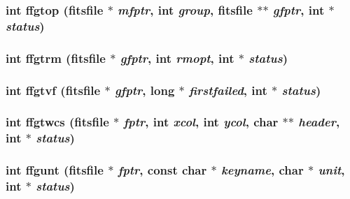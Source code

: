 \subsubsection{\setlength{\rightskip}{0pt plus 5cm}int ffgtop (\bf{fitsfile} $\ast$ {\em mfptr}, int {\em group}, \bf{fitsfile} $\ast$$\ast$ {\em gfptr}, int $\ast$ {\em status})}\label{src_2fitsio_8h_57ba25ba0c05bbdf61f15e21900264ec}


\subsubsection{\setlength{\rightskip}{0pt plus 5cm}int ffgtrm (\bf{fitsfile} $\ast$ {\em gfptr}, int {\em rmopt}, int $\ast$ {\em status})}\label{src_2fitsio_8h_8eb856e08aa6132af39ea5367b9f3d84}


\subsubsection{\setlength{\rightskip}{0pt plus 5cm}int ffgtvf (\bf{fitsfile} $\ast$ {\em gfptr}, long $\ast$ {\em firstfailed}, int $\ast$ {\em status})}\label{src_2fitsio_8h_62614e8f30dfc3b69da9082d255df146}


\subsubsection{\setlength{\rightskip}{0pt plus 5cm}int ffgtwcs (\bf{fitsfile} $\ast$ {\em fptr}, int {\em xcol}, int {\em ycol}, char $\ast$$\ast$ {\em header}, int $\ast$ {\em status})}\label{src_2fitsio_8h_8aebd57fb3bdfea239f253d351428280}


\subsubsection{\setlength{\rightskip}{0pt plus 5cm}int ffgunt (\bf{fitsfile} $\ast$ {\em fptr}, const char $\ast$ {\em keyname}, char $\ast$ {\em unit}, int $\ast$ {\em status})}\label{src_2fitsio_8h_3ded4758cbd229441eb87d0db121198f}



